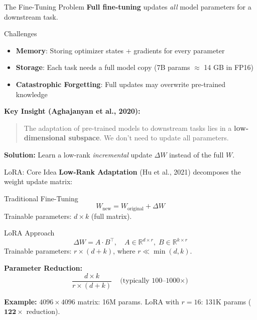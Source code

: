 \documentclass[aspectratio=169,10pt]{beamer}
\begin{document}
\begin{frame}{The Fine-Tuning Problem}
	\textbf{Full fine-tuning} updates \emph{all} model parameters for a downstream task.

	\vspace{0.3cm}
	\begin{block}{Challenges}
		\begin{itemize}
			\item \textbf{Memory}: Storing optimizer states + gradients for every parameter
			\item \textbf{Storage}: Each task needs a full model copy (7B params $\approx$ 14 GB in FP16)
			\item \textbf{Catastrophic Forgetting}: Full updates may overwrite pre-trained knowledge
		\end{itemize}
	\end{block}

	\vspace{0.3cm}
	\textbf{Key Insight (Aghajanyan et al., 2020):}
	\begin{quote}
		The adaptation of pre-trained models to downstream tasks lies in a \textbf{low-dimensional subspace}. We don't need to update all parameters.
	\end{quote}

	\vspace{0.3cm}
	\textbf{Solution:} Learn a low-rank \emph{incremental} update $\Delta W$ instead of the full $W$.
\end{frame}

\begin{frame}{LoRA: Core Idea}
	\textbf{Low-Rank Adaptation} (Hu et al., 2021) decomposes the weight update matrix:

	\begin{block}{Traditional Fine-Tuning}
		$$W_{\text{new}} = W_{\text{original}} + \Delta W$$
		Trainable parameters: $d \times k$ (full matrix).
	\end{block}

	\begin{block}{LoRA Approach}
		$$\Delta W = A \cdot B^\top, \quad A \in \mathbb{R}^{d \times r},\; B \in \mathbb{R}^{k \times r}$$
		Trainable parameters: $r \times (d + k)$, where $r \ll \min(d, k)$.
	\end{block}


	\textbf{Parameter Reduction:}
	$$\frac{d \times k}{r \times (d + k)} \quad \text{(typically 100--1000$\times$)}$$


	\textbf{Example:} $4096 \times 4096$ matrix: 16M params. LoRA with $r=16$: 131K params ($\mathbf{122\times}$ reduction).
\end{frame}
\end{document}

